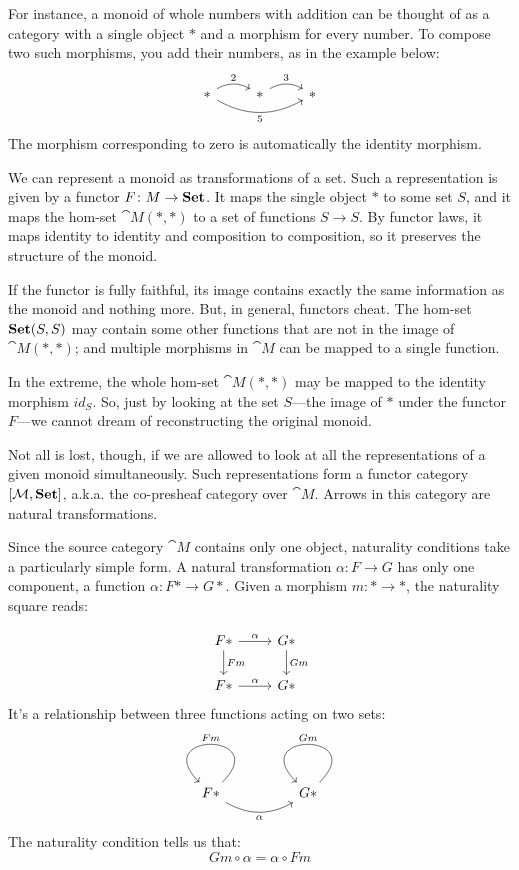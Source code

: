 \documentclass[DaoFP]{subfiles}
\begin{document}
For instance, a monoid of whole numbers with addition can be thought of as a category with a single object $*$ and a morphism for every number. To compose two such morphisms, you add their numbers, as in the example below:
\[
 \begin{tikzcd}
  *
  \arrow[r, bend left, "2"]
  \arrow[rr, bend right, "5"']
 & *
 \arrow[r, bend left, "3"]
 & *
  \end{tikzcd}
\]
The morphism corresponding to zero is automatically the identity morphism. 

We can represent a monoid as transformations of a set. Such a representation is given by a functor $F \colon M \to \mathbf{Set}$. It maps the single object $*$ to some set $S$, and it maps the hom-set $\cat M(*, *)$ to a set of functions $S \to S$. By functor laws, it maps identity to identity and composition to composition, so it preserves the structure of the monoid. 

If the functor is fully faithful, its image contains exactly the same information as the monoid and nothing more. But, in general, functors cheat. The hom-set $\mathbf{Set} (S, S)$ may contain some other functions that are not in the image of $\cat M(*, *)$; and multiple morphisms in $\cat M$ can be mapped to a single function. 

In the extreme, the whole hom-set $\cat M(*, *)$ may be mapped to the identity morphism $id_S$. So, just by looking at the set $S$---the image of $*$ under the functor $F$---we cannot dream of reconstructing the original monoid.

Not all is lost, though, if we are allowed to look at all the representations of a given monoid simultaneously. Such representations form a functor category $[\mathcal{M}, \mathbf{Set}]$, a.k.a. the co-presheaf category over $\cat M$. Arrows in this category are natural transformations. 

Since the source category $\cat M$ contains only one object, naturality conditions take a particularly simple form. A natural transformation $\alpha \colon F \to G$ has only one component, a function $\alpha \colon F * \to G *$. Given a morphism $m \colon * \to *$, the naturality square reads:

\[
 \begin{tikzcd}
 F *
 \arrow[r, "\alpha"]
 \arrow[d, "F m"]
 & G *
  \arrow[d, "G m"]
\\
 F *
 \arrow[r, "\alpha"]
 & G *
 \end{tikzcd}
\]
It's a relationship between three functions acting on two sets:
\[
 \begin{tikzcd}
 F *
  \arrow[loop, "F m"']
  \arrow[rr, bend right, "\alpha"']
 && G *
  \arrow[loop, "G m"']
  \end{tikzcd}
\]
The naturality condition tells us that:
\[ G m \circ \alpha = \alpha \circ F m \]
\end{document}
